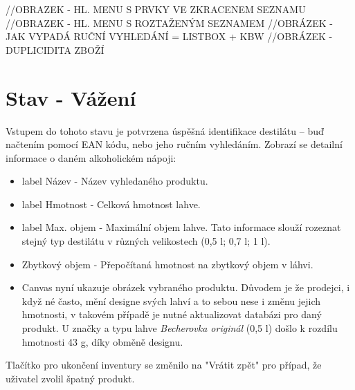 

//OBRAZEK - HL. MENU S PRVKY VE ZKRACENEM SEZNAMU
//OBRAZEK - HL. MENU S ROZTAŽENÝM SEZNAMEM
//OBRÁZEK - JAK VYPADÁ RUČNÍ VYHLEDÁNÍ = LISTBOX + KBW
//OBRÁZEK - DUPLICIDITA ZBOŽÍ

\section{Stav - Vážení}
Vstupem do tohoto stavu je potvrzena úspěšná identifikace destilátu – buď načtením pomocí EAN kódu, nebo jeho ručním vyhledáním. Zobrazí se detailní informace o daném alkoholickém nápoji:
\begin{itemize}
    \item label Název - Název vyhledaného produktu.
    \item label Hmotnost - Celková hmotnost lahve.
    \item label Max. objem - Maximální objem lahve. Tato informace slouží rozeznat stejný typ destilátu v různých velikostech (0,5 l; 0,7 l; 1 l).
    \item Zbytkový objem - Přepočítaná hmotnost na zbytkový objem v láhvi.
    \item Canvas nyní ukazuje obrázek vybraného produktu. Důvodem je že prodejci, i když né často, mění designe svých lahví a to sebou nese i změnu jejich hmotnosti, v takovém případě je nutné aktualizovat databázi pro daný produkt. U značky a typu lahve \textit{Becherovka originál} (0,5 l) došlo k rozdílu hmotnosti 43 g, díky obměně designu. 
\end{itemize}
\bigskip
Tlačítko pro ukončení inventury se změnilo na "Vrátit zpět" pro případ, že uživatel zvolil špatný produkt.

